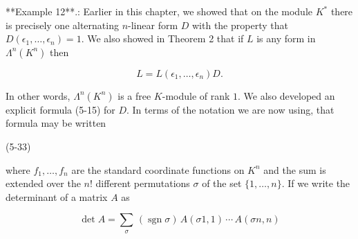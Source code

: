
**Example 12**.: Earlier in this chapter, we showed that on the module \(K^{*}\) there is precisely one alternating \(n\)-linear form \(D\) with the property that \(D(\epsilon_{1},\ldots,\epsilon_{n})=1\). We also showed in Theorem 2 that if \(L\) is any form in \(\Lambda^{n}(K^{n})\) then

\[L=L(\epsilon_{1},\ldots,\epsilon_{n})D.\]

In other words, \(\Lambda^{n}(K^{n})\) is a free \(K\)-module of rank \(1\). We also developed an explicit formula (5-15) for \(D\). In terms of the notation we are now using, that formula may be written

(5-33)

where \(f_{1},\ldots,f_{n}\) are the standard coordinate functions on \(K^{n}\) and the sum is extended over the \(n!\) different permutations \(\sigma\) of the set \(\{1,\ldots,n\}\). If we write the determinant of a matrix \(A\) as

\[\det A=\sum_{\sigma}\,(\operatorname{sgn}\sigma)\,A(\sigma 1,1)\,\cdots\,A(\sigma n,n)\] 
